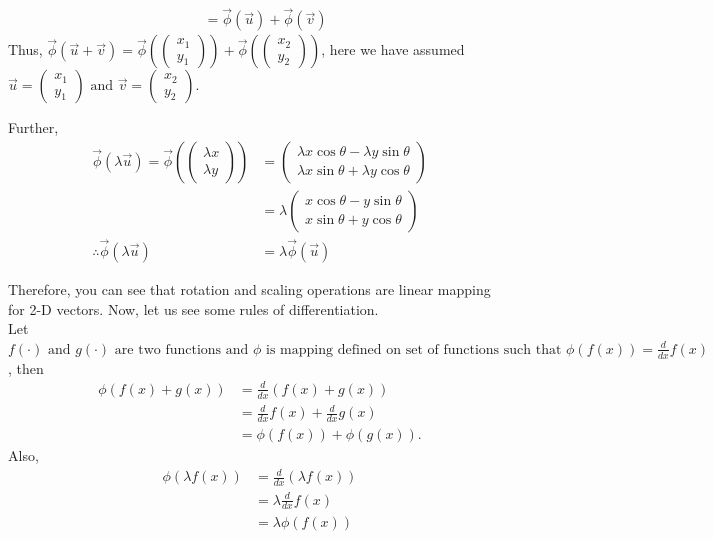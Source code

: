 \documentclass{article}
\begin{document}
\begin{enumerate}
\begin{align*}
 &=\vec{\phi}(\Vec{u})+\vec{\phi}(\Vec{v})
 \end{align*}
Thus, \(\vec{\phi}(\Vec{u}+\Vec{v}) = \vec{\phi}
\left(\begin{pmatrix}
 {x_1}\\{y_1}
\end{pmatrix}
\right) +
\vec{\phi}
\left(\begin{pmatrix}
 {x_2}\\{y_2}
\end{pmatrix}
\right)\), here we have assumed \(\Vec{u}=\begin{pmatrix}
 {x_1}\\{y_1}
\end{pmatrix} \text{ and } \Vec{v}=\begin{pmatrix}
 {x_2}\\{y_2}
\end{pmatrix}\).\par
Further,
\begin{align*}
 \vec{\phi}(\lambda\Vec{u})=\vec{\phi}\left(\begin{pmatrix}
 \lambda x\\ \lambda y
\end{pmatrix}
 \right)&=
 \begin{pmatrix}
 \lambda x\cos\theta-\lambda y\sin{\theta}\\\lambda x\sin\theta+\lambda y\cos{\theta}\end{pmatrix}
\\
 &= \lambda\begin{pmatrix}
 x\cos\theta-y\sin{\theta}\\x\sin\theta+y\cos{\theta}
\end{pmatrix}\\
\therefore \vec{\phi}(\lambda\Vec{u}) &= \lambda\vec{\phi}(\Vec{u})
\end{align*}
\end{enumerate}

Therefore, you can see that rotation and scaling operations are linear mapping for 2-D vectors. Now, let us see some rules of differentiation.\\

Let $f(\cdot) \text{ and } g(\cdot) \text{ are two functions and }\phi\text{ is mapping defined on set of functions such that } \phi(f(x))=\frac{d}{dx}f(x)$, then 
\begin{align*}
    \phi(f(x)+g(x))&=\frac{d}{dx}(f(x)+g(x))\\
    &=\frac{d}{dx}f(x)+\frac{d}{dx}g(x)\\
    &=\phi (f(x))+\phi(g(x)).
\end{align*}
Also, 
\begin{align*}
    \phi(\lambda f(x))&=\frac{d}{dx}(\lambda f(x))\\
    &=\lambda\frac{d}{dx}f(x)\\
    &=\lambda \phi (f(x))
\end{align*}
\end{document}
